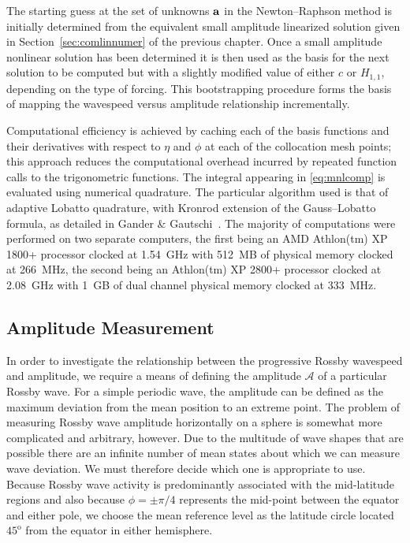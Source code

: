 The starting guess at the set of unknowns $\mathbf{a}$ in the Newton--Raphson method is initially determined from the equivalent small amplitude linearized solution given in Section~\ref{sec:comlinnumer} of the previous chapter. Once a small amplitude nonlinear solution has been determined it is then used as the basis for the next solution to be computed but with a slightly modified value of either $c$ or $H_{1,1}$, depending on the type of forcing. This bootstrapping procedure forms the basis of mapping the wavespeed versus amplitude relationship incrementally.

Computational efficiency is achieved by caching each of the basis functions and their derivatives with respect to $\eta$ and $\phi$ at each of the collocation mesh points; this approach reduces the computational overhead incurred by repeated function calls to the trigonometric functions. The integral appearing in \eqref{eq:mnlcomp} is evaluated using numerical quadrature. The particular algorithm used is that of adaptive Lobatto quadrature, with Kronrod extension of the Gauss--Lobatto formula, as detailed in Gander \& Gautschi~\cite{Gander:AQR}. The majority of computations were performed on two separate computers, the first being an AMD Athlon(tm) XP 1800+ processor clocked at 1.54~GHz with 512~MB of physical memory clocked at 266~MHz, the second being an Athlon(tm) XP 2800+ processor clocked at 2.08~GHz with 1~GB of dual channel physical memory clocked at 333~MHz.

\subsection{Amplitude Measurement}
\label{subsec:comampmeas}
In order to investigate the relationship between the progressive Rossby wavespeed and amplitude, we require a means of defining the amplitude $\mathcal{A}$ of a particular Rossby wave. For a simple periodic wave, the amplitude can be defined as the maximum deviation from the mean position to an extreme point. The problem of measuring Rossby wave amplitude horizontally on a sphere is somewhat more complicated and arbitrary, however. Due to the multitude of wave shapes that are possible there are an infinite number of mean states about which we can measure wave deviation. We must therefore decide which one is appropriate to use. Because Rossby wave activity is predominantly associated with the mid-latitude regions and also because $\phi=\pm \pi/4$ represents the mid-point between the equator and either pole, we choose the mean reference level as the latitude circle located $45^\text{o}$ from the equator in either hemisphere.

